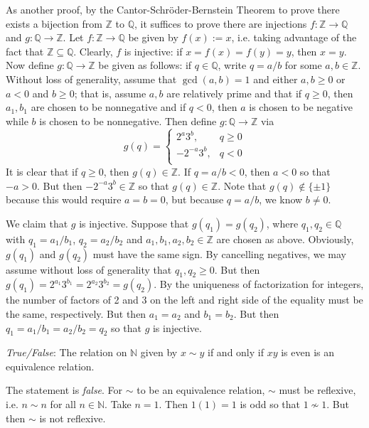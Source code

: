 \documentclass[11pt,letterpaper]{article}
\begin{document}
As another proof, by the Cantor-Schr\"oder-Bernstein Theorem to prove there exists a bijection from $\mathbb{Z}$ to $\mathbb{Q}$, it suffices to prove there are injections $f: \mathbb{Z} \to \mathbb{Q}$ and $g: \mathbb{Q} \to \mathbb{Z}$. Let $f: \mathbb{Z} \to \mathbb{Q}$ be given by $f(x):= x$, i.e. taking advantage of the fact that $\mathbb{Z} \subseteq \mathbb{Q}$. Clearly, $f$ is injective: if $x= f(x) = f(y) = y$, then $x= y$. Now define $g: \mathbb{Q} \to \mathbb{Z}$ be given as follows: if $q \in \mathbb{Q}$, write $q= a/b$ for some $a, b \in \mathbb{Z}$. Without loss of generality, assume that $\gcd(a, b)= 1$ and either $a, b \geq 0$ or $a < 0$ and $b \geq 0$; that is, assume $a, b$ are relatively prime and that if $q \geq 0$, then $a_1, b_1$ are chosen to be nonnegative and if $q < 0$, then $a$ is chosen to be negative while $b$ is chosen to be nonnegative. Then define $g: \mathbb{Q} \to \mathbb{Z}$ via
	\[
	g(q)= 
	\begin{cases}
	2^a 3^b, & q \geq 0 \\
	-2^{-a} 3^b, & q < 0 \\
	\end{cases}
	\]
It is clear that if $q \geq 0$, then $g(q) \in \mathbb{Z}$. If $q= a/b < 0$, then $a < 0$ so that $-a > 0$. But then $-2^{-a} 3^b \in \mathbb{Z}$ so that $g(q) \in \mathbb{Z}$. Note that $g(q) \notin \{ \pm 1 \}$ because this would require $a= b= 0$, but because $q= a/b$, we know $b \neq 0$. \pspace

We claim that $g$ is injective. Suppose that $g(q_1)= g(q_2)$, where $q_1, q_2 \in \mathbb{Q}$ with $q_1= a_1/b_1$, $q_2= a_2/b_2$ and $a_1, b_1, a_2, b_2 \in \mathbb{Z}$ are chosen as above. Obviously, $g(q_1)$ and $g(q_2)$ must have the same sign. By cancelling negatives, we may assume without loss of generality that $q_1, q_2 \geq 0$. But then $g(q_1)= 2^{a_1} 3^{b_1} = 2^{a_2} 3^{b_2}= g(q_2)$. By the uniqueness of factorization for integers, the number of factors of 2 and 3 on the left and right side of the equality must be the same, respectively. But then $a_1= a_2$ and $b_1= b_2$. But then $q_1= a_1/b_1= a_2/b_2= q_2$ so that $g$ is injective. \pvspace{1.5cm}



\quizsol \textit{True/False}: 
The relation on $\mathbb{N}$ given by $x \sim y$ if and only if $xy$ is even is an equivalence relation. \pspace

\sol The statement is \textit{false}. For $\sim$ to be an equivalence relation, $\sim$ must be reflexive, i.e. $n \sim n$ for all $n \in \mathbb{N}$. Take $n= 1$. Then $1(1)= 1$ is odd so that $1 \not\sim 1$. But then $\sim$ is not reflexive. \pvspace{1.5cm}
\end{document}
